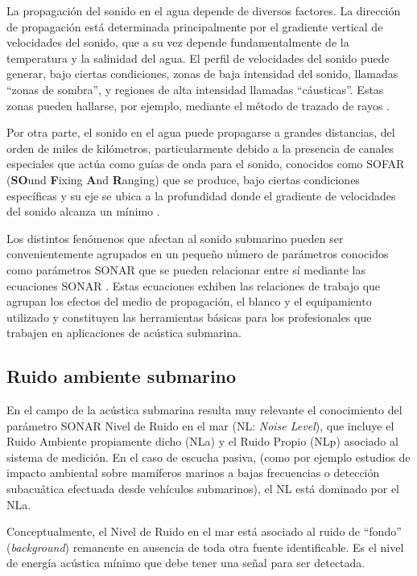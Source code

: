 La propagación del sonido en el agua depende de diversos factores.  La dirección de propagación está determinada principalmente por el gradiente vertical de velocidades del sonido, que a su vez depende fundamentalmente de la temperatura y la salinidad del agua.  El perfil de velocidades del sonido puede generar, bajo ciertas condiciones, zonas de baja intensidad del sonido, llamadas ``zonas de sombra'', y regiones de alta intensidad llamadas ``cáusticas''. Estas zonas pueden hallarse, por ejemplo, mediante el método de trazado de rayos \citep{tappert1977parabolic}.

Por otra parte, el sonido en el agua puede propagarse a grandes distancias, del orden de miles de kilómetros, particularmente debido a la presencia de canales especiales que actúa como guías de onda para el sonido, conocidos como SOFAR (\textbf{SO}und \textbf{F}ixing \textbf{A}nd \textbf{R}anging) que se produce, bajo ciertas condiciones específicas y su eje se ubica a la profundidad donde el gradiente de velocidades del sonido alcanza un mínimo \citep{medwin1997fundamentals}. 

Los distintos fenómenos que afectan al sonido submarino pueden ser convenientemente agrupados en un pequeño número de parámetros conocidos como parámetros SONAR que se pueden relacionar entre sí mediante las ecuaciones SONAR \citep{urick1975principles}.  Estas ecuaciones exhiben las relaciones de trabajo que agrupan los efectos del medio de propagación, el blanco y el equipamiento utilizado y constituyen las herramientas básicas para los profesionales que trabajen en aplicaciones de acústica submarina. 

\subsection{Ruido ambiente submarino}
\label{subsec:ruido}

En el campo de la acústica submarina resulta muy relevante el conocimiento del parámetro SONAR Nivel de Ruido en el mar (NL: \textit{Noise Level}), que incluye el Ruido Ambiente propiamente dicho (NLa) y el Ruido Propio (NLp) asociado al sistema de medición. En el caso de escucha pasiva, (como por ejemplo estudios de impacto ambiental sobre mamíferos marinos a bajas frecuencias o detección subacuática efectuada desde vehículos submarinos), el NL está dominado por el NLa.

Conceptualmente, el Nivel de Ruido en el mar está asociado al ruido de ``fondo'' (\textit{background}) remanente en ausencia de toda otra fuente identificable. Es el nivel de energía acústica mínimo que debe tener una señal para ser detectada.

